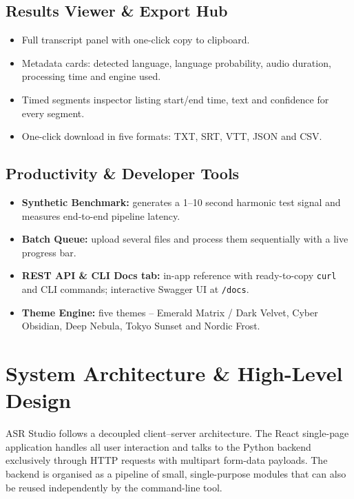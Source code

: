 \documentclass[11pt,a4paper]{article}
\begin{document}
\subsection{Results Viewer \& Export Hub}
\begin{itemize}[leftmargin=1.2em,itemsep=1pt]
  \item Full transcript panel with one-click copy to clipboard.
  \item Metadata cards: detected language, language probability, audio duration, processing time and engine used.
  \item Timed segments inspector listing start/end time, text and confidence for every segment.
  \item One-click download in five formats: TXT, SRT, VTT, JSON and CSV.
\end{itemize}

\subsection{Productivity \& Developer Tools}
\begin{itemize}[leftmargin=1.2em,itemsep=1pt]
  \item \textbf{Synthetic Benchmark:} generates a 1--10 second harmonic test signal and measures end-to-end pipeline latency.
  \item \textbf{Batch Queue:} upload several files and process them sequentially with a live progress bar.
  \item \textbf{REST API \& CLI Docs tab:} in-app reference with ready-to-copy \texttt{curl} and CLI commands; interactive Swagger UI at \texttt{/docs}.
  \item \textbf{Theme Engine:} five themes -- Emerald Matrix / Dark Velvet, Cyber Obsidian, Deep Nebula, Tokyo Sunset and Nordic Frost.
\end{itemize}

\clearpage
\section{System Architecture \& High-Level Design}
ASR Studio follows a decoupled client--server architecture. The React single-page application handles all user interaction and talks to the Python backend exclusively through HTTP requests with multipart form-data payloads. The backend is organised as a pipeline of small, single-purpose modules that can also be reused independently by the command-line tool.
\end{document}
